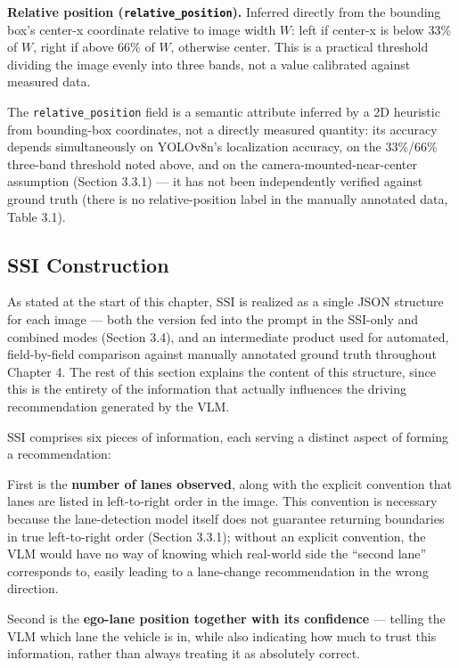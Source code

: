 \documentclass[12pt,a4paper]{report}
\begin{document}
\textbf{Relative position (\texttt{relative\_position}).} Inferred directly from the bounding box's center-x coordinate relative to image width $W$: left if center-x is below 33\% of $W$, right if above 66\% of $W$, otherwise center. This is a practical threshold dividing the image evenly into three bands, not a value calibrated against measured data.

The \texttt{relative\_position} field is a semantic attribute inferred by a 2D heuristic from bounding-box coordinates, not a directly measured quantity: its accuracy depends simultaneously on YOLOv8n's localization accuracy, on the 33\%/66\% three-band threshold noted above, and on the camera-mounted-near-center assumption (Section 3.3.1) --- it has not been independently verified against ground truth (there is no relative-position label in the manually annotated data, Table 3.1).

\subsection{SSI Construction}

As stated at the start of this chapter, SSI is realized as a single JSON structure for each image --- both the version fed into the prompt in the SSI-only and combined modes (Section 3.4), and an intermediate product used for automated, field-by-field comparison against manually annotated ground truth throughout Chapter 4. The rest of this section explains the content of this structure, since this is the entirety of the information that actually influences the driving recommendation generated by the VLM.

SSI comprises six pieces of information, each serving a distinct aspect of forming a recommendation:

First is the \textbf{number of lanes observed}, along with the explicit convention that lanes are listed in left-to-right order in the image. This convention is necessary because the lane-detection model itself does not guarantee returning boundaries in true left-to-right order (Section 3.3.1); without an explicit convention, the VLM would have no way of knowing which real-world side the ``second lane'' corresponds to, easily leading to a lane-change recommendation in the wrong direction.

Second is the \textbf{ego-lane position together with its confidence} --- telling the VLM which lane the vehicle is in, while also indicating how much to trust this information, rather than always treating it as absolutely correct.
\end{document}
